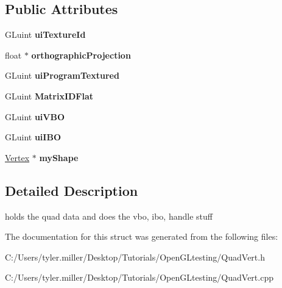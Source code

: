 \subsection*{Public Attributes}
\begin{DoxyCompactItemize}
\item 
\hypertarget{struct_quad_vert_a29be693d6d2a0a7281b25930dc994e50}{}G\+Luint {\bfseries ui\+Texture\+Id}\label{struct_quad_vert_a29be693d6d2a0a7281b25930dc994e50}

\item 
\hypertarget{struct_quad_vert_a8a7da09de6338203875fac240416fbe9}{}float $\ast$ {\bfseries orthographic\+Projection}\label{struct_quad_vert_a8a7da09de6338203875fac240416fbe9}

\item 
\hypertarget{struct_quad_vert_a1032e8f33bbddb78052a89baa4819842}{}G\+Luint {\bfseries ui\+Program\+Textured}\label{struct_quad_vert_a1032e8f33bbddb78052a89baa4819842}

\item 
\hypertarget{struct_quad_vert_ab0d94d3281bc26c1f472544a8b29dc7e}{}G\+Luint {\bfseries Matrix\+I\+D\+Flat}\label{struct_quad_vert_ab0d94d3281bc26c1f472544a8b29dc7e}

\item 
\hypertarget{struct_quad_vert_ab5ffd70245d4881434254da163c9c409}{}G\+Luint {\bfseries ui\+V\+B\+O}\label{struct_quad_vert_ab5ffd70245d4881434254da163c9c409}

\item 
\hypertarget{struct_quad_vert_a65cc53ec1d7be1646c1cd79bc8ac8f19}{}G\+Luint {\bfseries ui\+I\+B\+O}\label{struct_quad_vert_a65cc53ec1d7be1646c1cd79bc8ac8f19}

\item 
\hypertarget{struct_quad_vert_a7e5734197fa4523855a2d0fe90c6c9bb}{}\hyperlink{struct_vertex}{Vertex} $\ast$ {\bfseries my\+Shape}\label{struct_quad_vert_a7e5734197fa4523855a2d0fe90c6c9bb}

\end{DoxyCompactItemize}


\subsection{Detailed Description}
holds the quad data and does the vbo, ibo, handle stuff 

The documentation for this struct was generated from the following files\+:\begin{DoxyCompactItemize}
\item 
C\+:/\+Users/tyler.\+miller/\+Desktop/\+Tutorials/\+Open\+G\+Ltesting/Quad\+Vert.\+h\item 
C\+:/\+Users/tyler.\+miller/\+Desktop/\+Tutorials/\+Open\+G\+Ltesting/Quad\+Vert.\+cpp\end{DoxyCompactItemize}
